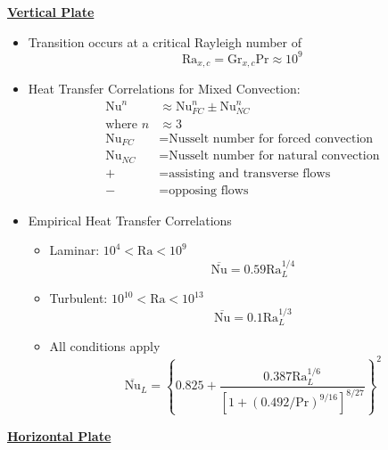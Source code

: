 \textbf{\underline{\color{red}Vertical Plate\color{black}}}
\begin{itemize}
    \item Transition occurs at a critical Rayleigh number of
    \begin{equation*}
        \text{Ra}_{x,c} = \text{Gr}_{x,c}\text{Pr} \approx 10^9
    \end{equation*}
    \item Heat Transfer Correlations for Mixed Convection:
    \begin{align*}
        \text{Nu}^n &\approx \text{Nu}_{FC}^{n} \pm \text{Nu}_{NC}^{n} \\
        \text{where } n &\approx 3 \\
        \text{Nu}_{FC} &= \text{Nusselt number for forced convection} \\
        \text{Nu}_{NC} &= \text{Nusselt number for natural convection}\\
        + &= \text{assisting and transverse flows}\\
        - &= \text{opposing flows}
    \end{align*}
    \item Empirical Heat Transfer Correlations
    \begin{itemize}
        \item Laminar: $10^4<\text{Ra}<10^9$
        \begin{equation*}
            \overline{\text{Nu}} = 0.59 \text{Ra}_L^{1/4}
        \end{equation*}
        \item Turbulent: $10^{10} < \text{Ra} < 10^{13}$
        \begin{equation*}
            \overline{\text{Nu}} = 0.1 \text{Ra}^{1/3}_{L}
        \end{equation*}
        \item All conditions apply
        \begin{equation*}
            \overline{\text{Nu}}_L = \left\{ 0.825+ \frac{0.387\text{Ra}_{L}^{1/6}}{\left[1+(0.492/\text{Pr})^{9/16}\right]^{8/27}} \right\}^2
        \end{equation*} 
    \end{itemize}
\end{itemize}
\textbf{\underline{\color{red}Horizontal Plate\color{black}}}
